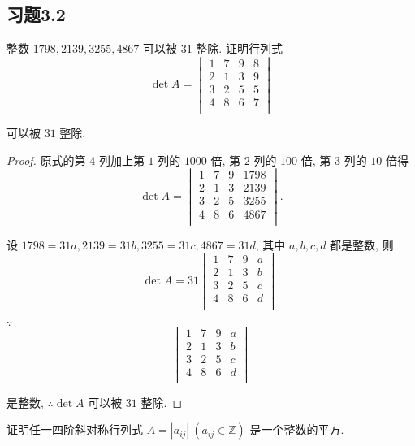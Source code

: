 \documentclass{ctexart}
\begin{document}
\subsection{习题3.2}
\begin{exercise}%
    整数 $1798,2139,3255,4867$ 可以被 $31$ 整除. 证明行列式
    \[\det A=\begin{vmatrix}
        1 & 7 & 9 & 8 \\
        2 & 1 & 3 & 9 \\
        3 & 2 & 5 & 5 \\
        4 & 8 & 6 & 7 \\
    \end{vmatrix}\]

    可以被 $31$ 整除.
\end{exercise}
\begin{proof}
    原式的第 $4$ 列加上第 $1$ 列的 $1000$ 倍, 第 $2$ 列的 $100$ 倍, 第 $3$ 列的 $10$ 倍得
    \[\det A=\begin{vmatrix}
        1 & 7 & 9 & 1798 \\
        2 & 1 & 3 & 2139 \\
        3 & 2 & 5 & 3255 \\
        4 & 8 & 6 & 4867 \\
    \end{vmatrix}.\]

    设 $1798=31a,2139=31b,3255=31c,4867=31d$, 其中 $a,b,c,d$ 都是整数, 则
    \[\det A=31\begin{vmatrix}
        1 & 7 & 9 & a \\
        2 & 1 & 3 & b \\
        3 & 2 & 5 & c \\
        4 & 8 & 6 & d \\
    \end{vmatrix}.\]

    $\because$
    \[\begin{vmatrix}
        1 & 7 & 9 & a \\
        2 & 1 & 3 & b \\
        3 & 2 & 5 & c \\
        4 & 8 & 6 & d \\
    \end{vmatrix}\]

    是整数, $\therefore\det A$ 可以被 $31$ 整除.
\end{proof}
\begin{exercise}%
    证明任一四阶斜对称行列式 $A=|a_{ij}|\ (a_{ij}\in\mathbb{Z})$ 是一个整数的平方.
\end{exercise}
\end{document}
